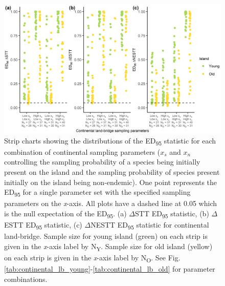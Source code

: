 \begin{figure}
    \centering
    \includegraphics{continental_land_bridge_sample_facet.png}
    \caption{Strip charts showing the distributions of the ED\textsubscript{95} statistic for each combination of continental sampling parameters ($x_s$ and $x_n$ controlling the sampling probability of a species being initially present on the island and the sampling probability of species present initially on the island being non-endemic). One point represents the ED\textsubscript{95} for a single parameter set with the specified sampling parameters on the \textit{x}-axis. All plots have a dashed line at 0.05 which is the null expectation of the ED\textsubscript{95}. (a) $\Delta$STT ED\textsubscript{95} statistic, (b) $\Delta$ESTT ED\textsubscript{95} statistic, (c) $\Delta$NESTT ED\textsubscript{95} statistic for continental land-bridge. Sample size for young island (green) on each strip is given in the \textit{x}-axis label by N\textsubscript{Y}. Sample size for old island (yellow) on each strip is given in the \textit{x}-axis label by N\textsubscript{O}. See Fig. \ref{tab:continental_lb_young}-\ref{tab:continental_lb_old} for parameter combinations.}
    \label{fig:continental_land_bridge_sample_facet}
\end{figure}

